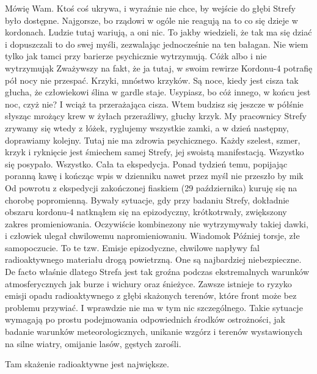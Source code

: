 \documentclass[../MAIN.tex]{subfiles}
\begin{document}
Mówię Wam. Ktoś coś ukrywa, i wyraźnie nie chce, by wejście do głębi Strefy było dostępne. Najgorsze, bo rządowi w ogóle nie reagują na to co się dzieje w kordonach. Ludzie tutaj wariują, a oni nic. To jakby wiedzieli, że tak ma się dziać i dopuszczali to do swej myśli, zezwalając jednocześnie na ten bałagan. Nie wiem tylko jak tamci przy barierze psychicznie wytrzymują. Cóż\3k albo i nie wytrzymują\3k Zważywszy na fakt, że ja tutaj, w swoim rewirze Kordonu-4 potrafię pół nocy nie przespać. Krzyki, mnóstwo krzyków. Są noce, kiedy jest cisza tak głucha, że człowiekowi ślina w gardle staje. Usypiasz, bo cóż innego, w końcu jest noc, czyż nie? I wciąż ta przerażająca cisza. Wtem budzisz się jeszcze w półśnie słysząc mrożący krew w żyłach przeraźliwy, głuchy krzyk. My pracownicy Strefy zrywamy się wtedy z łóżek, ryglujemy wszystkie zamki, a w dzień następny, doprawiamy kolejny. Tutaj nie ma zdrowia psychicznego. Każdy szelest, szmer, krzyk i ryknięcie jest śmiechem samej Strefy, jej swoistą manifestacją.
% 
% 
Wszystko się posypało. Wszystko. Cała ta ekspedycja. Ponad tydzień temu, popijając poranną kawę i kończąc wpis w dzienniku nawet przez myśl nie przeszło by mi\3k
% 
% 
Od powrotu z ekspedycji zakończonej fiaskiem (29 października) kuruję się na chorobę popromienną. Bywały sytuacje, gdy przy badaniu Strefy, dokładnie obszaru kordonu-4 natknąłem się na epizodyczny, krótkotrwały, zwiększony zakres promieniowania. Oczywiście kombinezony nie wytrzymywały takiej dawki, i człowiek ulegał chwilowemu napromieniowaniu. Wiadomo\3k Później torsje, złe samopoczucie. To te tzw. Emisje epizodyczne, chwilowe napływy fal radioaktywnego materiału drogą powietrzną. One są najbardziej niebezpieczne. De facto właśnie dlatego Strefa jest tak groźna podczas ekstremalnych warunków atmosferycznych jak burze i wichury oraz śnieżyce. Zawsze istnieje to ryzyko emisji opadu radioaktywnego z głębi skażonych terenów, które front może bez problemu przywiać. I wprawdzie nie ma w tym nic szczególnego. Takie sytuacje wymagają po prostu podejmowania odpowiednich środków ostrożności, jak badanie warunków meteorologicznych, unikanie wzgórz i terenów wystawionych na silne wiatry, omijanie lasów, gęstych zarośli.
 
Tam skażenie radioaktywne jest największe.
\end{document}
